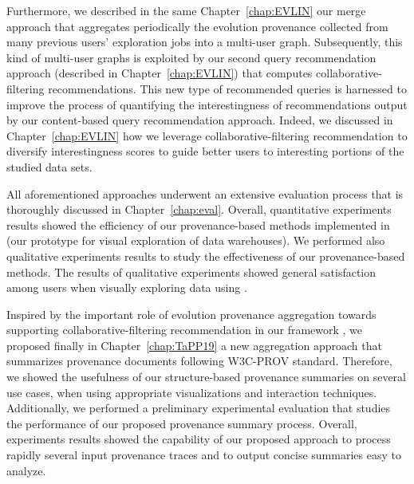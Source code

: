 Furthermore, we described in the same Chapter~\ref{chap:EVLIN} our merge approach that aggregates periodically the evolution provenance collected from many previous users' exploration jobs into a multi-user graph. 
Subsequently, this kind of multi-user graphs is exploited by our second query recommendation approach (described in Chapter~\ref{chap:EVLIN}) that computes collaborative-filtering recommendations.
This new type of recommended queries is harnessed to improve the process of quantifying the interestingness of recommendations output by our content-based query recommendation approach. 
Indeed, we discussed in Chapter~\ref{chap:EVLIN} how we leverage collaborative-filtering recommendation to diversify interestingness scores to 
guide better users to interesting portions of the studied data sets.

All aforementioned approaches underwent an extensive evaluation process that is thoroughly discussed in Chapter~\ref{chap:eval}. Overall, quantitative experiments results showed the efficiency of our provenance-based methods implemented in \prototype{} (our prototype for visual exploration of data warehouses).
We performed also qualitative experiments results to study the effectiveness of our provenance-based methods. The results of qualitative experiments showed general satisfaction among users when visually exploring data using \prototype{}.


Inspired by the important role of evolution provenance aggregation towards supporting collaborative-filtering recommendation in our framework \framework{}, we proposed finally in Chapter~\ref{chap:TaPP19} a new aggregation approach that summarizes provenance documents following W3C-PROV standard. Therefore, we showed the usefulness of our structure-based provenance summaries on several use cases, when using appropriate visualizations and interaction techniques. Additionally, we performed a preliminary experimental evaluation that studies the performance of our proposed provenance summary process. 
Overall, experiments results showed the capability of our proposed approach to process rapidly several input provenance traces and to output concise summaries easy to analyze.
 
